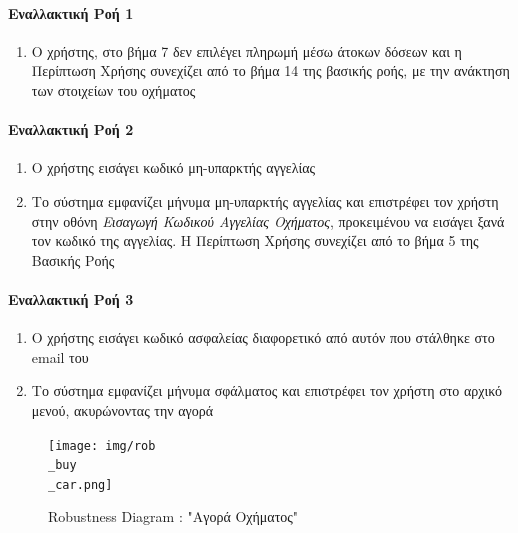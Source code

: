 \documentclass{../ol-softwaremanual}
\begin{document}
	\paragraph{Εναλλακτική Ροή 1}
	\begin{enumerate}
		\item Ο χρήστης, στο βήμα 7 δεν επιλέγει πληρωμή μέσω άτοκων δόσεων και η Περίπτωση Χρήσης συνεχίζει από το βήμα 14 της βασικής ροής, με την ανάκτηση των στοιχείων του οχήματος
	\end{enumerate}
	
	\paragraph{Εναλλακτική Ροή 2}
	\begin{enumerate}
		\item Ο χρήστης εισάγει κωδικό μη-υπαρκτής αγγελίας
		\item Το σύστημα εμφανίζει μήνυμα μη-υπαρκτής αγγελίας και επιστρέφει τον χρήστη στην οθόνη \textit{Εισαγωγή Κωδικού Αγγελίας Οχήματος}, προκειμένου να εισάγει ξανά τον κωδικό της αγγελίας. Η Περίπτωση Χρήσης συνεχίζει από το βήμα 5 της Βασικής Ροής
	\end{enumerate}
	
	\paragraph{Εναλλακτική Ροή 3}
	\begin{enumerate}
		\item Ο χρήστης εισάγει κωδικό ασφαλείας διαφορετικό από αυτόν που στάλθηκε στο \en email \gr του
		\item Το σύστημα εμφανίζει μήνυμα σφάλματος και επιστρέφει τον χρήστη στο αρχικό μενού, ακυρώνοντας την αγορά
	\end{enumerate}
	
	\newpage	
	
	\begin{figure}[htbp!]
		\texttt{[image: img/rob\\\_buy\\\_car.png]}
		\caption{\en Robustness Diagram : "\gr Αγορά Οχήματος\en"\gr\protect\footnotemark[4]}
	\end{figure}
	
	
\end{document}

